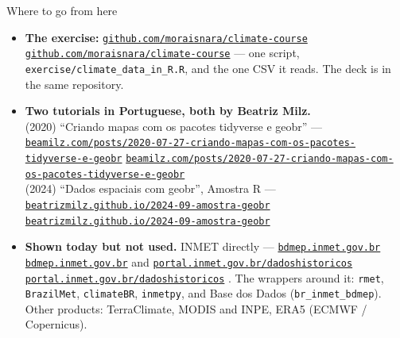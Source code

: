 \documentclass[aspectratio=169,10pt]{beamer}
\newcommand{\code}[1]{\texttt{\small #1}}
\newcommand{\wl}[2][]{%
  \ifx\relax#1\relax
    \href{https://#2}{\code{#2}}%
  \else
    \href{#1}{\code{#2}}%
  \fi}
\newcommand{\dsub}[1]{{\scriptsize\color{climgrey}#1}}
\begin{document}
\begin{frame}{Where to go from here}
  \footnotesize
  \begin{itemize}
    \setlength{\itemsep}{4pt}
    \item \textbf{The exercise:} \wl{github.com/moraisnara/climate-course}
          --- one script, \code{exercise/climate\_data\_in\_R.R}, and the one
          CSV it reads. \dsub{The deck is in the same repository.}
    \item \textbf{Two tutorials in Portuguese, both by Beatriz Milz.}\\
          (2020) ``Criando mapas com os pacotes tidyverse e geobr'' ---
          \wl{beamilz.com/posts/2020-07-27-criando-mapas-com-os-pacotes-tidyverse-e-geobr}\\
          (2024) ``Dados espaciais com geobr'', Amostra R ---
          \wl{beatrizmilz.github.io/2024-09-amostra-geobr}
    \item \textbf{Shown today but not used.} INMET directly ---
          \wl{bdmep.inmet.gov.br} and
          \wl{portal.inmet.gov.br/dadoshistoricos}. The wrappers around it:
          \code{rmet}, \code{BrazilMet}, \code{climateBR}, \code{inmetpy}, and
          Base dos Dados (\code{br\_inmet\_bdmep}). Other products:
          TerraClimate, MODIS and INPE, ERA5 (ECMWF / Copernicus).
  \end{itemize}
  \vfill
\end{frame}
\end{document}
